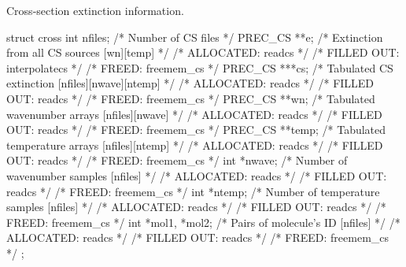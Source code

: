 \documentclass[letterpaper,12pt]{article}
\begin{document}
\noindent
Cross-section extinction information.
\begin{plain}
struct cross{
  int nfiles;       /* Number of CS files                                  */
  PREC_CS **e;     /* Extinction from all CS sources [wn][temp]           */
    /* ALLOCATED:	readcs						    */
    /* FILLED OUT:      interpolatecs					    */
    /* FREED:           freemem_cs					    */ 
  PREC_CS ***cs;  /* Tabulated CS extinction      [nfiles][nwave][ntemp] */
    /* ALLOCATED:	readcs						    */
    /* FILLED OUT:	readcs						    */
    /* FREED:           freemem_cs					    */ 
  PREC_CS **wn;    /* Tabulated wavenumber  arrays  [nfiles][nwave]        */
    /* ALLOCATED:	readcs						    */
    /* FILLED OUT:	readcs						    */
    /* FREED:           freemem_cs					    */ 
  PREC_CS **temp;  /* Tabulated temperature arrays  [nfiles][ntemp]        */
    /* ALLOCATED:	readcs						    */
    /* FILLED OUT:	readcs						    */
    /* FREED:           freemem_cs					    */ 
  int *nwave;       /* Number of wavenumber samples  [nfiles]               */
    /* ALLOCATED:	readcs						    */
    /* FILLED OUT:	readcs						    */
    /* FREED:           freemem_cs					    */ 
  int *ntemp;       /* Number of temperature samples [nfiles]               */
    /* ALLOCATED:	readcs						    */
    /* FILLED OUT:	readcs						    */
    /* FREED:           freemem_cs					    */ 
  int *mol1, *mol2; /* Pairs of molecule's ID        [nfiles]               */
    /* ALLOCATED:	readcs						    */
    /* FILLED OUT:	readcs						    */
    /* FREED:           freemem_cs					    */ 
};
\end{plain}
\end{document}
